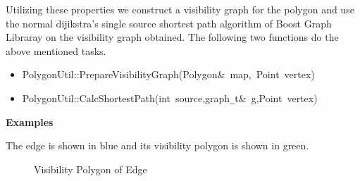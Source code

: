 Utilizing these properties we construct a visibility graph for the polygon and use the normal dijikstra's single source shortest path
algorithm of Boost Graph Libraray \cite{BOOST} on the visibility graph obtained. The following two functions do the above mentioned tasks.



\begin{itemize}


\item

{
\noindent \ttfamily
\noindent \ttfamily
\noindent \ttfamily
\noindent \ttfamily
\jttstylek PolygonUtil::PrepareVisibilityGraph\jttstylei (\jttstylek Polygon\&~map,~Point~vertex\jttstylei [])\\

}


\item

{
\noindent \ttfamily
\jttstylek PolygonUtil::CalcShortestPath\jttstylei (\jttstylej int~\jttstylek source,graph\verb#_#t\&~g,Point~vertex\jttstylei [])\\
\noindent \ttfamily
}

\end{itemize}

{\bf Examples}

The edge is shown in blue and its visibility polygon is shown in green.

\begin{figure}[h]
\begin{center}
\caption{\label{fig:Visibility Polygon of Edge}Visibility Polygon of Edge}
\end{center}
\end{figure}

